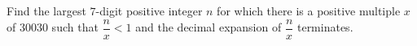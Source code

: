 Find the largest $7$-digit positive integer $n$ for which there is a positive multiple $x$ of $30030$ such that $\dfrac nx<1$ and the decimal expansion of $\dfrac nx$ terminates.
